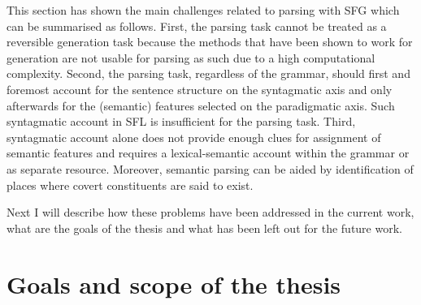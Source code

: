 This section has shown the main challenges related to parsing with SFG which can be summarised as follows. 
First, the parsing task cannot be treated as a reversible generation task because the methods that have been shown to work for generation are not usable for parsing as such due to a high computational complexity. Second, the parsing task, regardless of the grammar, should first and foremost account for the sentence structure on the syntagmatic axis and only afterwards for the (semantic) features selected on the paradigmatic axis. Such syntagmatic account in SFL is insufficient for the parsing task. Third, syntagmatic account alone does not provide enough clues for assignment of semantic features and requires a lexical-semantic account within the grammar or as separate resource. Moreover, semantic parsing can be aided by identification of places where covert constituents are said to exist. %

Next I will describe how these problems have been addressed in the current work, what are the goals of the thesis and what has been left out for the future work.


%

\section{Goals and scope of the thesis}
\label{sec:solution}

